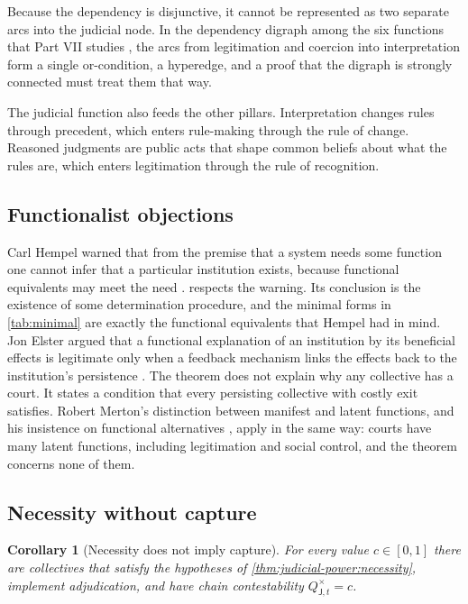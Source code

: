 \documentclass[11pt,letterpaper]{article}
\newtheorem{corollary}[theorem]{Corollary}
\theoremstyle{definition}
\theoremstyle{remark}
\newcommand{\pJ}{\mathsf{J}}
\newcommand{\Qchain}{Q^{\times}_{\pJ,t}}
\begin{document}
Because the dependency is disjunctive, it cannot be represented as two separate arcs into the judicial node. In the dependency digraph among the six functions that Part VII studies \citep{long2026formalized}, the arcs from legitimation and coercion into interpretation form a single or-condition, a hyperedge, and a proof that the digraph is strongly connected must treat them that way.

The judicial function also feeds the other pillars. Interpretation changes rules through precedent, which enters rule-making through the rule of change. Reasoned judgments are public acts that shape common beliefs about what the rules are, which enters legitimation through the rule of recognition.

\subsection{Functionalist objections}

Carl Hempel warned that from the premise that a system needs some function one cannot infer that a particular institution exists, because functional equivalents may meet the need \citep{hempel1959}.  respects the warning. Its conclusion is the existence of some determination procedure, and the minimal forms in \cref{tab:minimal} are exactly the functional equivalents that Hempel had in mind. Jon Elster argued that a functional explanation of an institution by its beneficial effects is legitimate only when a feedback mechanism links the effects back to the institution's persistence \citep{elster1983}. The theorem does not explain why any collective has a court. It states a condition that every persisting collective with costly exit satisfies. Robert Merton's distinction between manifest and latent functions, and his insistence on functional alternatives \citep{merton1968}, apply in the same way: courts have many latent functions, including legitimation and social control, and the theorem concerns none of them.

\subsection{Necessity without capture}

\begin{corollary}[Necessity does not imply capture]
\label{cor:judicial-power:nonimplication}
For every value $c\in[0,1]$ there are collectives that satisfy the hypotheses of \cref{thm:judicial-power:necessity}, implement adjudication, and have chain contestability $\Qchain=c$.
\end{corollary}
\end{document}
